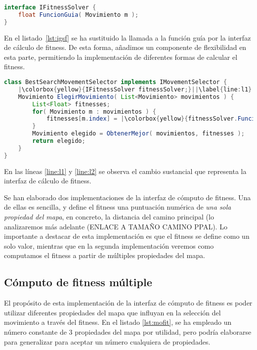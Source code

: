 \begin{lstlisting}[caption={Interfaz de cómputo de fitness},label={lst:ifit},language=Java]
interface IFitnessSolver {
	float FuncionGuia( Movimiento m );
}
\end{lstlisting}

En el listado~\ref{lst:igsf} se ha sustituido la llamada a la función guía por la interfaz de cálculo de fitness. De esta forma, añadimos un componente de flexibilidad en esta parte, permitiendo la implementación de diferentes formas de calcular el fitness.

\begin{lstlisting}[caption={Interfaz de selección de movimiento basada en búsqueda},label={lst:igsf},language=Java,escapechar=|]
class BestSearchMovementSelector implements IMovementSelector {
	|\colorbox{yellow}{IFitnessSolver fitnessSolver;}||\label{line:l1}|
	Movimiento ElegirMovimiento( List<Movimiento> movimientos ) {
		List<Float> fitnesses;
		for( Movimiento m : movimientos ) {
			fitnesses[m.index] = |\colorbox{yellow}{fitnessSolver.FuncionGuia( m );}||\label{line:l2}|
		}
		Movimiento elegido = ObtenerMejor( movimientos, fitnesses );
		return elegido;
	}
}
\end{lstlisting}

En las líneas \ref{line:l1} y \ref{line:l2} se observa el cambio sustancial que representa la interfaz de cálculo de fitness.

Se han elaborado dos implementaciones de la interfaz de cómputo de fitness. Una de ellas es sencilla, y define el fitness una puntuación numérica de \emph{una sola propiedad del mapa}, en concreto, la distancia del camino principal (lo analizaremos más adelante (ENLACE A TAMAÑO CAMINO PPAL). Lo importante a destacar de esta implementación es que el fitness se define como un solo valor, mientras que en la segunda implementación veremos como computamos el fitness a partir de múltiples propiedades del mapa.

\subsection{Cómputo de fitness múltiple}

El propósito de esta implementación de la interfaz de cómputo de fitness es poder utilizar diferentes propiedades del mapa que influyan en la selección del movimiento a través del fitness. En el listado \ref{lst:mofit}, se ha empleado un número constante de 3 propiedades del mapa por utilidad, pero podría elaborarse para generalizar para aceptar un número cualquiera de propiedades.

